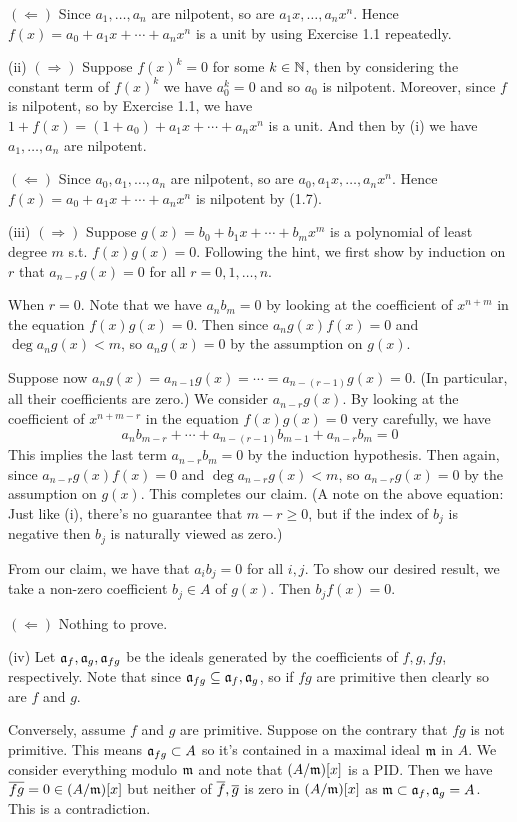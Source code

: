 \documentclass[../A&M.tex]{subfiles}
\begin{document}
$(\Leftarrow)$ Since $a_1,\ldots,a_n$ are nilpotent, so are $a_1x,\ldots,a_nx^n$. Hence $f(x)=a_0+a_1x+\cdots+a_nx^n$ is a unit by using Exercise 1.1 repeatedly.

(ii) $(\Rightarrow)$ Suppose $f(x)^k=0$ for some $k\in\mathbb{N}$, then by considering the constant term of $f(x)^k$ we have $a_0^k=0$ and so $a_0$ is nilpotent. Moreover, since $f$ is nilpotent, so by Exercise 1.1, we have $1+f(x) = (1+a_0)+a_1x+\cdots+a_nx^n$ is a unit. And then by (i) we have $a_1,\ldots,a_n$ are nilpotent.

$(\Leftarrow)$ Since $a_0,a_1,\ldots,a_n$ are nilpotent, so are $a_0,a_1x,\ldots,a_nx^n$. Hence $f(x)=a_0+a_1x+\cdots+a_nx^n$ is nilpotent by (1.7).

(iii) $(\Rightarrow)$ Suppose $g(x)=b_0+b_1x+\cdots+b_mx^m$ is a polynomial of least degree $m$ s.t. $f(x)g(x)=0$. Following the hint, we first show by induction on $r$ that $a_{n-r}g(x)=0$ for all $r=0,1,\ldots,n$.

When $r=0$. Note that we have $a_n b_m=0$ by looking at the coefficient of $x^{n+m}$ in the equation $f(x)g(x)=0$. Then since $a_ng(x)f(x)=0$ and $\deg a_ng(x)<m$, so $a_ng(x)=0$ by the assumption on $g(x)$.

Suppose now $a_ng(x) = a_{n-1}g(x) = \cdots = a_{n-(r-1)}g(x) = 0$. (In particular, all their coefficients are zero.) We consider $a_{n-r}g(x)$. By looking at the coefficient of $x^{n+m-r}$ in the equation $f(x)g(x) = 0$ very carefully, we have
$$
a_n b_{m-r} + \cdots + a_{n-(r-1)} b_{m-1} + a_{n-r} b_m = 0
$$
This implies the last term $a_{n-r} b_m=0$ by the induction hypothesis. Then again, since $a_{n-r}g(x)f(x)=0$ and $\deg a_{n-r}g(x)<m$, so $a_{n-r}g(x)=0$ by the assumption on $g(x)$. This completes our claim. (A note on the above equation: Just like (i), there's no guarantee that $m-r\geq0$, but if the index of $b_j$ is negative then $b_j$ is naturally viewed as zero.)

From our claim, we have that $a_ib_j=0$ for all $i,j$. To show our desired result, we take a non-zero coefficient $b_j\in A$ of $g(x)$. Then $b_jf(x)=0$.

$(\Leftarrow)$ Nothing to prove.

(iv) Let $\mathfrak{a}_f,\mathfrak{a}_g,\mathfrak{a}_{fg}$ be the ideals generated by the coefficients of $f,g,fg$, respectively. Note that since $\mathfrak{a}_{fg}\subseteq \mathfrak{a}_f,\mathfrak{a}_g$, so if $fg$ are primitive then clearly so are $f$ and $g$.

Conversely, assume $f$ and $g$ are primitive. Suppose on the contrary that $fg$ is not primitive. This means $\mathfrak{a}_{fg}\subset A$ so it's contained in a maximal ideal $\mathfrak{m}$ in $A$. We consider everything modulo $\mathfrak{m}$ and note that $(A/\mathfrak{m})[x]$ is a PID. Then we have $\overline{fg} = 0 \in (A/\mathfrak{m})[x]$ but neither of $\overline{f},\overline{g}$ is zero in $(A/\mathfrak{m})[x]$ as $\mathfrak{m} \subset \mathfrak{a}_f,\mathfrak{a}_g = A$. This is a contradiction.
\end{document}
